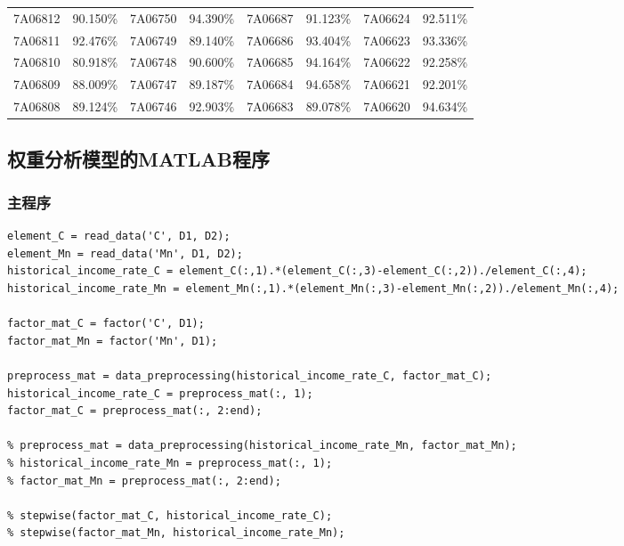 \documentclass[12pt]{article}%
\begin{document}
\begin{longtable}{|cc|cc|cc|cc|}
7A06812              & 90.150\% & 7A06750              & 94.390\% & 7A06687              & 91.123\% & 7A06624              & 92.511\% \\
7A06811              & 92.476\% & 7A06749              & 89.140\% & 7A06686              & 93.404\% & 7A06623              & 93.336\% \\
7A06810              & 80.918\% & 7A06748              & 90.600\% & 7A06685              & 94.164\% & 7A06622              & 92.258\% \\
7A06809              & 88.009\% & 7A06747              & 89.187\% & 7A06684              & 94.658\% & 7A06621              & 92.201\% \\
7A06808              & 89.124\% & 7A06746              & 92.903\% & 7A06683              & 89.078\% & 7A06620              & 94.634\% \\
    \end{longtable}
    
\subsection{权重分析模型的MATLAB程序}
\subsubsection{主程序}
\begin{lstlisting}
element_C = read_data('C', D1, D2);
element_Mn = read_data('Mn', D1, D2);
historical_income_rate_C = element_C(:,1).*(element_C(:,3)-element_C(:,2))./element_C(:,4);
historical_income_rate_Mn = element_Mn(:,1).*(element_Mn(:,3)-element_Mn(:,2))./element_Mn(:,4);

factor_mat_C = factor('C', D1);
factor_mat_Mn = factor('Mn', D1);

preprocess_mat = data_preprocessing(historical_income_rate_C, factor_mat_C);
historical_income_rate_C = preprocess_mat(:, 1);
factor_mat_C = preprocess_mat(:, 2:end);

% preprocess_mat = data_preprocessing(historical_income_rate_Mn, factor_mat_Mn);
% historical_income_rate_Mn = preprocess_mat(:, 1);
% factor_mat_Mn = preprocess_mat(:, 2:end);

% stepwise(factor_mat_C, historical_income_rate_C);
% stepwise(factor_mat_Mn, historical_income_rate_Mn);
\end{lstlisting}
\end{document}
